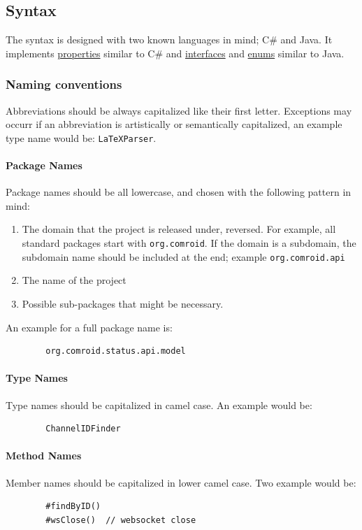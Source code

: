 \documentclass{docs}
\begin{document}
    \subsection{Syntax}
    The syntax is designed with two known languages in mind; C\# and Java. It implements \hyperref[langProperty]{properties} similar to C\# and \hyperref[langInterface]{interfaces} and \hyperref[langEnum]{enums} similar to Java. \\

    \subsubsection{Naming conventions} %
    Abbreviations should be always capitalized like their first letter. Exceptions may occurr if an abbreviation is artistically or semantically capitalized, an example type name would be: \texttt{LaTeXParser}.

    \paragraph{Package Names}
    Package names should be all lowercase, and chosen with the following pattern in mind:
    \begin{enumerate}
        \item The domain that the project is released under, reversed. For example, all standard packages start with \texttt{org.comroid}. If the domain is a subdomain, the subdomain name should be included at the end; example \texttt{org.comroid.api}
        \item The name of the project
        \item Possible sub-packages that might be necessary.
    \end{enumerate}
    An example for a full package name is:
    \begin{verbatim}
        org.comroid.status.api.model
    \end{verbatim}

    \paragraph{Type Names}
    Type names should be capitalized in camel case.
    An example would be:
    \begin{verbatim}
        ChannelIDFinder
    \end{verbatim}

    \paragraph{Method Names}
    Member names should be capitalized in lower camel case.
    Two example would be:
    \begin{verbatim}
        #findByID()
        #wsClose()  // websocket close
    \end{verbatim}
\end{document}
